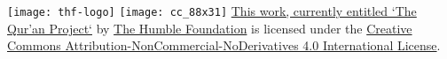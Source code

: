 \texttt{[image: thf-logo]}
\texttt{[image: cc\_88x31]}
\href{http://github.com/humblefoundation/quran-project}{This work, currently entitled `The Qur'an Project`} by \href{http://www.humblefoundation.org}{The Humble Foundation} is licensed under the \href{http://creativecommons.org/licenses/by-nc-nd/4.0/}{Creative Commons Attribution-NonCommercial-NoDerivatives 4.0 International License}.